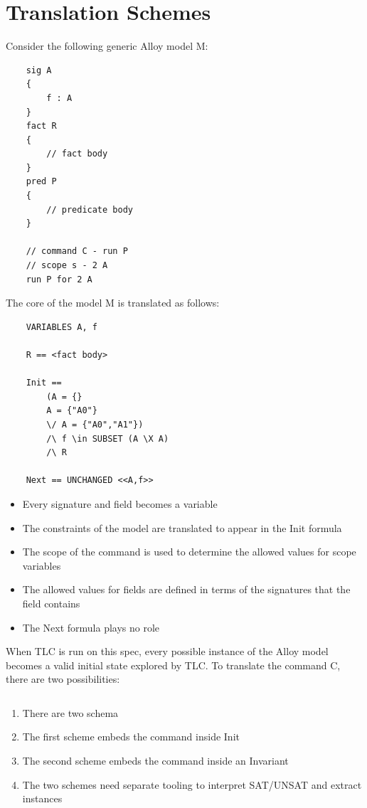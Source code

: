 \section{Translation Schemes}

Consider the following generic Alloy model M:


\begin{lstlisting}
	sig A
	{
		f : A
	}
	fact R
	{
		// fact body
	}
	pred P 
	{
		// predicate body
	}

	// command C - run P
	// scope s - 2 A
	run P for 2 A

\end{lstlisting}

The core of the model M is translated as follows:

\begin{lstlisting}
	VARIABLES A, f

	R == <fact body>

	Init == 
		(A = {}
		A = {"A0"}
		\/ A = {"A0","A1"})
		/\ f \in SUBSET (A \X A)
		/\ R

	Next == UNCHANGED <<A,f>>

\end{lstlisting}



\begin{itemize}
	\item Every signature and field becomes a variable
	\item The constraints of the model are translated to appear in the Init formula
	\item The scope of the command is used to determine the allowed values for scope variables
	\item The allowed values for fields are defined in terms of the signatures that the field contains
	\item The Next formula plays no role
\end{itemize}

When TLC is run on this spec, every possible instance of the Alloy model becomes a valid initial state explored by TLC. To translate the command C, there are two possibilities:

\begin{lstlisting}

\end{lstlisting}

\begin{enumerate}
	\item There are two schema
	\item The first scheme embeds the command inside Init
	\item The second scheme embeds the command inside an Invariant
	\item The two schemes need separate tooling to interpret SAT/UNSAT and extract instances
\end{enumerate}

